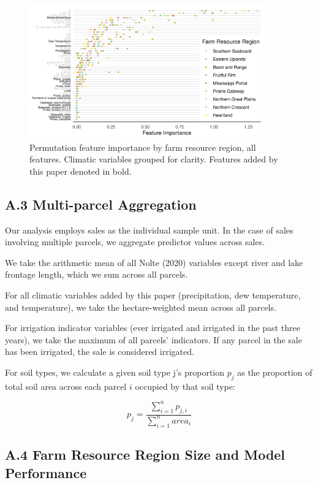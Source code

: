 \documentclass[12pt]{article}
\begin{document}
\begin{figure}[H]
    \centering
    \includegraphics[width=0.9\textwidth]{exhibits/ffb_importance_all.png}
    \caption{Permutation feature importance by farm resource region, all features. Climatic variables grouped for clarity. Features added by this paper denoted in bold.}
    \label{fig:ffb_importance_all}
\end{figure}

\newpage

\subsection*{A.3 Multi-parcel Aggregation}
Our analysis employs sales as the individual sample unit. In the case of sales involving multiple parcels, we aggregate predictor values across sales. 

We take the arithmetic mean of all Nolte (2020) variables except river and lake frontage length, which we sum across all parcels.

For all climatic variables added by this paper (precipitation, dew temperature, and temperature), we take the hectare-weighted mean across all parcels.

For irrigation indicator variables (ever irrigated and irrigated in the past three years), we take the maximum of all parcels' indicators. If any parcel in the sale has been irrigated, the sale is considered irrigated.

For soil types, we calculate a given soil type j's proportion $p_j$ as the proportion of total soil area across each parcel $i$ occupied by that soil type:

\[
p_j = \displaystyle\frac{\sum\limits_{i=1}^{n}p_{j,i}}{\sum\limits_{i=1}^{n}area_i}
\]

\newpage

\subsection*{A.4 Farm Resource Region Size and Model Performance}
\end{document}
